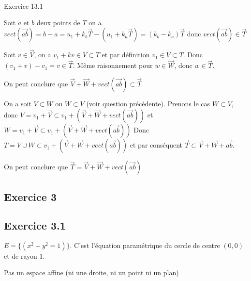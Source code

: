 \documentclass[]{book}
\theoremstyle{definition}
\begin{document}
Exercice 13.1

Soit $a$ et $b$ deux points de $T$ on a $vect(\overrightarrow{ab}) = b - a = u_1 + k_b\overrightarrow{T} - (u_1 + k_a \overrightarrow{T}) = (k_b-k_a) \overrightarrow{T}$ donc $vect(\overrightarrow{ab}) \in \overrightarrow{T}$

Soit $v \in \overrightarrow{V}$, on a $v_1 + k v \in V \subset T$ et par d\'efinition $v_1 \in V \subset T$. Donc $(v_1+v) - v_1 = v \in \overrightarrow{T}$. M\^eme raisonnement pour $w \in \overrightarrow{W}$, donc $w \in \overrightarrow{T}$.

On peut conclure que $\overrightarrow{V} + \overrightarrow{W} + vect(\overrightarrow{ab}) \subset \overrightarrow{T}$

On a soit $V \subset W$ ou $W \subset V$ (voir question pr\'ec\'edente). Prenons le cas $W \subset V$, donc $V = v_1 + \overrightarrow{V} \subset v_1 + (\overrightarrow{V} + \overrightarrow{W} + vect(\overrightarrow{ab})) $ et $W = v_1 + \overrightarrow{V} \subset v_1 + (\overrightarrow{V} + \overrightarrow{W} + vect(\overrightarrow{ab}))$ Donc $T = V \cup W \subset v_1 + (\overrightarrow{V} + \overrightarrow{W} + vect(\overrightarrow{ab}))$ et par cons\'equent $\overrightarrow{T} \subset \overrightarrow{V} + \overrightarrow{W} + \overrightarrow{ab}$.

On peut conclure que $\overrightarrow{T} = \overrightarrow{V} + \overrightarrow{W} + vect(\overrightarrow{ab})$


\subsection*{Exercice 3}
\subsection*{Exercice 3.1}
$E= \{ (x^2 + y^2 = 1)\}$. C'est l'\'equation param\'etrique du cercle de centre $(0,0)$ et de rayon 1.


Pas un espace affine (ni une droite, ni un point ni un plan)
\end{document}

